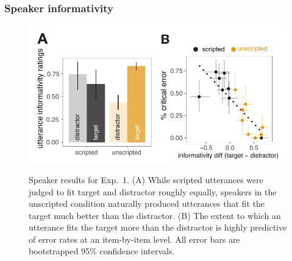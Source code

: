 \documentclass[manuscript]{stjour}
\begin{document}

\subsubsection{Speaker informativity}

 \begin{figure}[t!]
 \begin{center}
 \vspace{-.25cm}
 \includegraphics[scale=1]{figures/Exp1_speaker_results.pdf}
 \vspace{-.5cm}
 \caption{Speaker results for Exp.~1. (A) While scripted utterances were judged to fit target and distractor roughly equally, speakers in the unscripted condition naturally produced utterances that fit the target much better than the distractor. (B) The extent to which an utterance fits the target more than the distractor is highly predictive of error rates at an item-by-item level. All error bars are bootstrapped 95\% confidence intervals.}
 \vspace{-.5cm}
 \label{fig:exp1speaker}
 \end{center}
 \end{figure}
 
\end{document}
